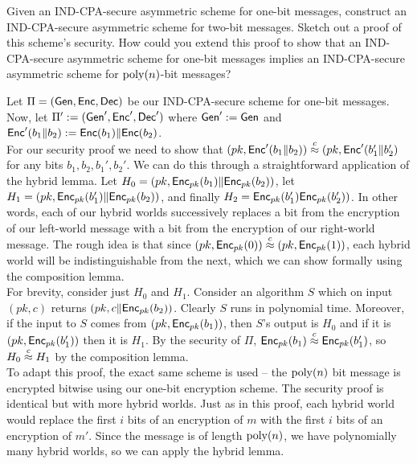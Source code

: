 \documentclass[11pt]{article}
\begin{document}
\begin{question}
    Given an IND-CPA-secure asymmetric scheme for one-bit messages, construct an
    IND-CPA-secure asymmetric scheme for two-bit messages. Sketch out a proof of this
    scheme's security. How could you extend this proof to show that an IND-CPA-secure
    asymmetric scheme for one-bit messages implies an IND-CPA-secure asymmetric scheme
    for \(\operatorname{poly}(n)\)-bit messages?
\end{question}
\begin{answer}
    Let \(\Pi = (\mathsf{Gen}, \mathsf{Enc}, \mathsf{Dec})\) be our IND-CPA-secure scheme for one-bit
    messages. Now, let \(\Pi' := (\mathsf{Gen}', \mathsf{Enc}', \mathsf{Dec}')\) where \(\mathsf{Gen}' :=
    \mathsf{Gen}\) and \(\mathsf{Enc}'(b_1 \| b_2) := \mathsf{Enc}(b_1) \| \mathsf{Enc}(b_2)\). \\

    For our security proof we need to show that \((pk, \mathsf{Enc}'(b_1 \| b_2))
    \stackrel{c}{\approx} (pk, \mathsf{Enc}'(b_1' \| b_2')\) for any bits \(b_1, b_2, b_1', b_2'\). We
    can do this through a straightforward application of the hybrid lemma. Let \(H_0 =
    (pk, \mathsf{Enc}_{pk}(b_1) \| \mathsf{Enc}_{pk}(b_2))\), let \(H_1 = (pk,
    \mathsf{Enc}_{pk}(b_1') \| \mathsf{Enc}_{pk}(b_2))\), and finally \(H_2 =
    \mathsf{Enc}_{pk}(b_1') \mathsf{Enc}_{pk}(b_2'))\). In other words, each of our hybrid worlds
    successively replaces a bit from the encryption of our left-world message with a bit
    from the encryption of our right-world message. The rough idea is that since
    \((pk, \mathsf{Enc}_{pk}(0)) \stackrel{c}{\approx} (pk, \mathsf{Enc}_{pk}(1))\), each hybrid world will be
    indistinguishable from the next, which we can show formally using the composition
    lemma.  \\

    \noindent For brevity, consider just \(H_0\) and \(H_1\). Consider an algorithm \(S\)
    which on input \((pk, c)\) returns \((pk, c \| \mathsf{Enc}_{pk}(b_2))\). Clearly \(S\)
    runs in polynomial time. Moreover, if the input to \(S\) comes from
    \((pk, \mathsf{Enc}_{pk}(b_1))\), then \(S\)'s output is \(H_0\) and if it is
    \((pk, \mathsf{Enc}_{pk}(b_1'))\) then it is \(H_1\). By the security of \(\Pi\),
    \(\mathsf{Enc}_{pk}(b_1) \stackrel{c}{\approx} \mathsf{Enc}_{pk}(b_1')\), so \(H_0 \stackrel{c}{\approx} H_1\) by the
    composition lemma. \\

    \noindent To adapt this proof, the exact same scheme is used -- the \(\operatorname{poly}(n)\) bit
    message is encrypted bitwise using our one-bit encryption scheme. The security proof
    is identical but with more hybrid worlds. Just as in this proof, each hybrid world
    would replace the first \(i\) bits of an encryption of \(m\) with the first \(i\)
    bits of an encryption of \(m'\). Since the message is of length \(\operatorname{poly}(n)\), we have
    polynomially many hybrid worlds, so we can apply the hybrid lemma.
\end{answer}
\end{document}
